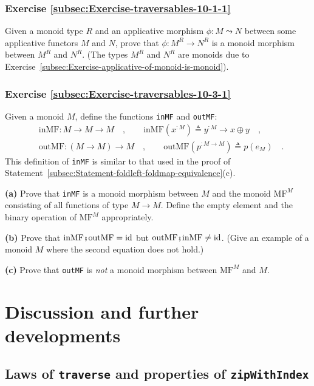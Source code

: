 \subsubsection{Exercise \label{subsec:Exercise-traversables-10-1-1}\ref{subsec:Exercise-traversables-10-1-1}}

Given a monoid type $R$ and an applicative morphism $\phi:M\leadsto N$
between some applicative functors $M$ and $N$, prove that $\phi:M^{R}\rightarrow N^{R}$
is a monoid morphism between $M^{R}$ and $N^{R}$. (The types $M^{R}$
and $N^{R}$ are monoids due to Exercise~\ref{subsec:Exercise-applicative-of-monoid-is-monoid}).

\subsubsection{Exercise \label{subsec:Exercise-traversables-10-3-1}\ref{subsec:Exercise-traversables-10-3-1}}

Given a monoid $M$, define the functions \lstinline!inMF! and \lstinline!outMF!:
\begin{align*}
 & \text{inMF}:M\rightarrow M\rightarrow M\quad,\quad\quad\text{inMF}(x^{:M})\triangleq y^{:M}\rightarrow x\oplus y\quad,\\
 & \text{outMF}:(M\rightarrow M)\rightarrow M\quad,\quad\quad\text{outMF}(p^{:M\rightarrow M})\triangleq p(e_{M})\quad.
\end{align*}
This definition of \lstinline!inMF! is similar to that used in the
proof of Statement~\ref{subsec:Statement-foldleft-foldmap-equivalence}(c).

\textbf{(a)} Prove that \lstinline!inMF! is a monoid morphism between
$M$ and the monoid $\text{MF}^{M}$ consisting of all functions of
type $M\rightarrow M$. Define the empty element and the binary operation
of $\text{MF}^{M}$ appropriately.

\textbf{(b)} Prove that $\text{inMF}\bef\text{outMF}=\text{id}$ but
$\text{outMF}\bef\text{inMF}\neq\text{id}$. (Give an example of a
monoid $M$ where the second equation does not hold.)

\textbf{(c)} Prove that \lstinline!outMF! is \emph{not} a monoid
morphism between $\text{MF}^{M}$ and $M$.

\section{Discussion and further developments}

\subsection{Laws of \texttt{traverse} and properties of \texttt{zipWithIndex}\label{subsec:Laws-of-traverse-and-zipWithIndex}}

